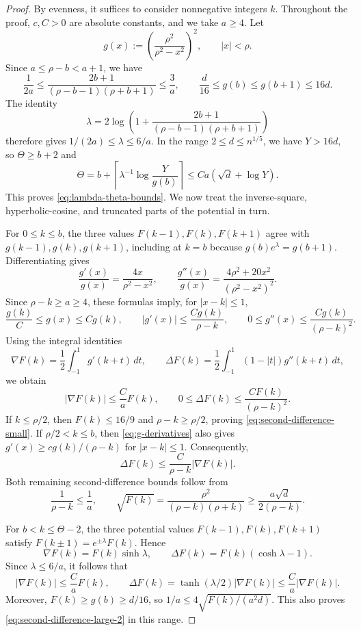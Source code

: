\documentclass[reqno,english]{amsart}
\theoremstyle{definition}
\begin{document}
\begin{proof}
By evenness, it suffices to consider nonnegative integers $k$.
Throughout the proof, $c,C>0$ are absolute constants, and we take $a\ge4$.
Let
\[
    g(x):=\left(\frac{\rho^2}{\rho^2-x^2}\right)^2,
    \qquad |x|<\rho.
\]
Since $a\le\rho-b<a+1$, we have
\[
 \frac{1}{2a}
 \le\frac{2b+1}{(\rho-b-1)(\rho+b+1)}
 \le\frac{3}{a},
 \qquad
 \frac{d}{16}\le g(b)\le g(b+1)\le16d.
\]
The identity
\[
 \lambda=2\log\left(1+
   \frac{2b+1}{(\rho-b-1)(\rho+b+1)}\right)
\]
therefore gives $1/(2a)\le\lambda\le6/a$.
In the range $2\le d\le {n^{1/5}}$, we have $Y>16d$, so
$\Theta\ge b+2$ and
\[
 \Theta=b+\left\lceil\lambda^{-1}\log\frac{Y}{g(b)}\right\rceil
 \le Ca(\sqrt d+\log Y).
\]
This proves \eqref{eq:lambda-theta-bounds}. We now treat the inverse-square,
{\color{black}hyperbolic-cosine}, and truncated parts of the potential in turn.

For $0\le k\le b$, the three values $F(k-1),F(k),F(k+1)$ agree with
$g(k-1),g(k),g(k+1)$, including at $k=b$ because
$g(b)e^\lambda=g(b+1)$. Differentiating gives
\begin{equation}\label{eq:g-derivatives}
 \frac{g'(x)}{g(x)}=\frac{4x}{\rho^2-x^2},
 \qquad
 \frac{g''(x)}{g(x)}
   =\frac{4\rho^2+20x^2}{(\rho^2-x^2)^2}.
\end{equation}
Since $\rho-k\ge a\ge4$, these formulas imply, for $|x-k|\le1$,
\begin{equation}\label{eq:g-local-bounds}
 \frac{g(k)}{C}\le g(x)\le Cg(k),\qquad
 |g'(x)|\le\frac{Cg(k)}{\rho-k},\qquad
 0\le g''(x)\le\frac{Cg(k)}{(\rho-k)^2}.
\end{equation}
Using the integral identities
\[
 \nabla F(k)=\frac12\int_{-1}^{1}g'(k+t)\,dt,
 \qquad
 \Delta F(k)=\frac12\int_{-1}^{1}(1-|t|)g''(k+t)\,dt,
\]
we obtain
\[
 |\nabla F(k)|\le\frac{C}{a}F(k),
 \qquad
 0\le\Delta F(k)\le\frac{CF(k)}{(\rho-k)^2}.
\]
If $k\le\rho/2$, then $F(k)\le16/9$ and $\rho-k\ge\rho/2$, proving
\eqref{eq:second-difference-small}. If $\rho/2<k\le b$, then
\eqref{eq:g-derivatives} also gives
$g'(x)\ge cg(k)/(\rho-k)$ for $|x-k|\le1$. Consequently,
\[
 \Delta F(k)\le\frac{C}{\rho-k}|\nabla F(k)|.
\]
Both remaining second-difference bounds follow from
\[
 \frac{1}{\rho-k}\le\frac1a,
 \qquad
 \sqrt{F(k)}=\frac{\rho^2}{(\rho-k)(\rho+k)}
 \ge\frac{a\sqrt d}{2(\rho-k)}.
\]

For $b<k\le\Theta-2$, {\color{black}the three potential values $F(k-1),F(k),F(k+1)$ satisfy $F(k\pm1)=e^{\pm\lambda}F(k)$.} Hence
\[
 \nabla F(k)=F(k)\sinh\lambda,
 \qquad
 \Delta F(k)=F(k)(\cosh\lambda-1).
\]
Since $\lambda\le6/a$, it follows that
\[
 |\nabla F(k)|\le\frac{C}{a}F(k),
 \qquad
 \Delta F(k)=\tanh(\lambda/2)|\nabla F(k)|
 \le\frac{C}{a}|\nabla F(k)|.
\]
Moreover, $F(k)\ge g(b)\ge d/16$, so
$1/a\le4\sqrt{F(k)/(a^2d)}$. This also proves
\eqref{eq:second-difference-large-2} in this range.



\end{proof}
\end{document}
